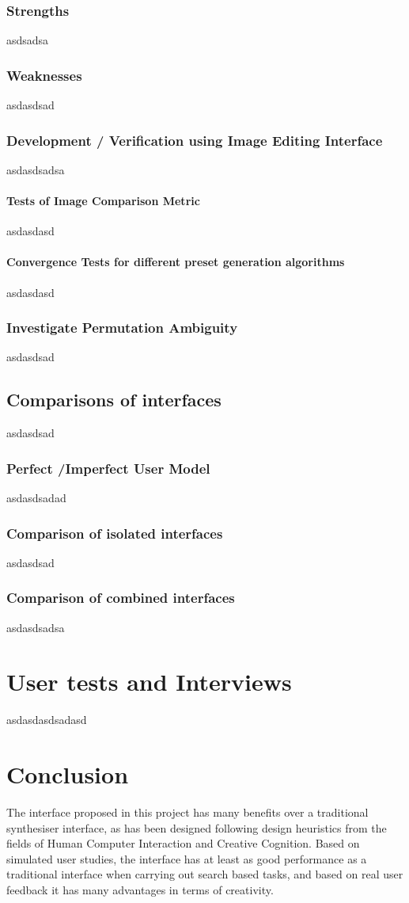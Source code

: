 \documentclass[11pt, oneside]{report}   	%
\begin{document}
\subsection{Strengths}
asdsadsa
\subsection{Weaknesses}
asdasdsad
\subsection{Development / Verification using Image Editing Interface}
asdasdsadsa
\subsubsection{Tests of Image Comparison Metric}
asdasdasd
\subsubsection{Convergence Tests for different preset generation algorithms}
asdasdasd
\subsection{Investigate Permutation Ambiguity}
asdasdsad

\section{Comparisons of interfaces}
asdasdsad
\subsection{Perfect /Imperfect User Model}
asdasdsadad
\subsection{Comparison of isolated interfaces}
asdasdsad
\subsection{Comparison of combined interfaces}
asdasdsadsa

\chapter{User tests and Interviews}
asdasdasdsadasd

\chapter{Conclusion}
The interface proposed in this project has many benefits over a traditional synthesiser interface, as has been designed following design heuristics from the fields of Human Computer Interaction and Creative Cognition. Based on simulated user studies, the interface has at least as good performance as a traditional interface when carrying out search based tasks, and based on real user feedback it has many advantages in terms of creativity.
\end{document}
